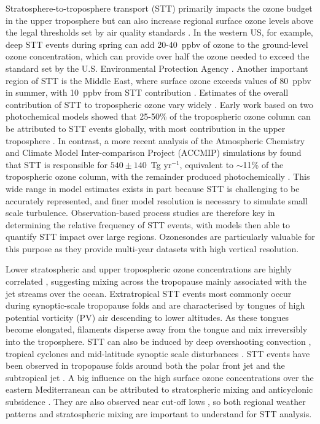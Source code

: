 \documentclass[acp, manuscript]{copernicus} %
\begin{document}
  Stratosphere-to-troposphere transport (STT) primarily impacts the ozone budget in the upper troposphere but can also increase regional surface ozone levels above the legal thresholds set by air quality standards \citep{Danielson1968, Lelieveld2009, Lefohn2011, Langford2012, Zhang2014, Lin2015}.
  In the western US, for example, deep STT events during spring can add 20-40~ppbv of ozone to the ground-level ozone concentration, which can provide over half the ozone needed to exceed the standard set by the U.S. Environmental Protection Agency \citep{Lin2012, Lin2015}.
  Another important region of STT is the Middle East, where surface ozone exceeds values of 80~ppbv in summer, with 10~ppbv from STT contribution \citep{Lelieveld2009}.
  Estimates of the overall contribution of STT to tropospheric ozone vary widely \citep[e.g.][]{Galani2003, Stohl2003, Stevenson2006, Lefohn2011}.
  Early work based on two photochemical models showed that 25-50\% of the tropospheric ozone column can be attributed to STT events globally, with most contribution in the upper troposphere \citep{Stohl2003}.
  In contrast, a more recent analysis of the Atmospheric Chemistry and Climate Model Inter-comparison Project (ACCMIP) simulations by \citet{Young2013} found that STT is responsible for $540\pm140$~Tg yr$^{-1}$, equivalent to $\sim$11\% of the tropospheric ozone column, with the remainder produced photochemically \citep{Monks2015}.
  This wide range in model estimates exists in part because STT is challenging to be accurately represented, and finer model resolution is necessary to simulate small scale turbulence.
  Observation-based process studies are therefore key in determining the relative frequency of STT events, with models then able to quantify STT impact over large regions.
  Ozonesondes are particularly valuable for this purpose as they provide multi-year datasets with high vertical resolution.

  Lower stratospheric and upper tropospheric ozone concentrations are highly correlated \citep{Terao2008}, suggesting mixing across the tropopause mainly associated with the jet streams over the ocean.
  Extratropical STT events most commonly occur during synoptic-scale tropopause folds \citep{Sprenger2003, Tang2012, Frey2015} and are characterised by tongues of high potential vorticity (PV) air descending to lower altitudes.
  As these tongues become elongated, filaments disperse away from the tongue and mix irreversibly into the troposphere.
  STT can also be induced by deep overshooting convection \citep{Frey2015}, tropical cyclones \citep{Das2016} and mid-latitude synoptic scale disturbances \citep[e.g.][]{Stohl2003, Mihalikova2012}. 
  STT events have been observed in tropopause folds around both the polar front jet \citep{Vaughan1994, Beekmann1997} and the subtropical jet \citep{Baray2000}.
  A big influence on the high surface ozone concentrations over the eastern Mediterranean can be attributed to stratospheric mixing and anticyclonic subsidence \citep{Zanis2014}. 
  They are also observed near cut-off lows \citep{Price1993, Wirth1995}, so both regional weather patterns and stratospheric mixing are important to understand for STT analysis.
  
\end{document}
